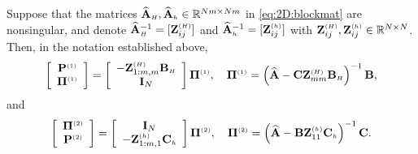 \begin{lemma} \label{lem:2D:pp}
Suppose that the matrices $\matAHhat, \matAhhat \in \mathbb{R}^{Nm\times Nm}$
in \eqref{eq:2D:blockmat} are nonsingular, and denote $\matAHhat^{-1}=[\Z^{\klein{(H)}}_{ij}]$ and
$\matAhhat^{-1}=[\Z^{\klein{(h)}}_{ij}]$ with
$\Z^{\klein{(H)}}_{ij},\Z^{\klein{(h)}}_{ij}\in \mathbb{R}^{N\times N}$.
Then, in the notation established above,
%
\[
\left[
\begin{array}{c}
\POne \\ \PiOne
\end{array}
\right] =
\left[
\begin{array}{c}
-\Z^{\klein{(H)}}_{1:m,m}\matBH \\  \I_{N}
\end{array}
\right] \PiOne,
\quad
\PiOne = \left( \matA - \matC \Z^{\klein{(H)}}_{mm}
\matBH \right)^{-1}\matB, %
\]
%
and
%
\[
\left[
\begin{array}{c}
\PiTwo\\
\PTwo
\end{array}
\right] =
\left[
\begin{array}{c}
\I_{N} \\
-\Z^{\klein{(h)}}_{1:m,1}\matCh
\end{array}
\right] \PiTwo,
\quad
\PiTwo =\left( \matA - \matB \Z^{\klein{(h)}}_{11} \matCh \right)^{-1}\matC.
\]
%
\end{lemma}

